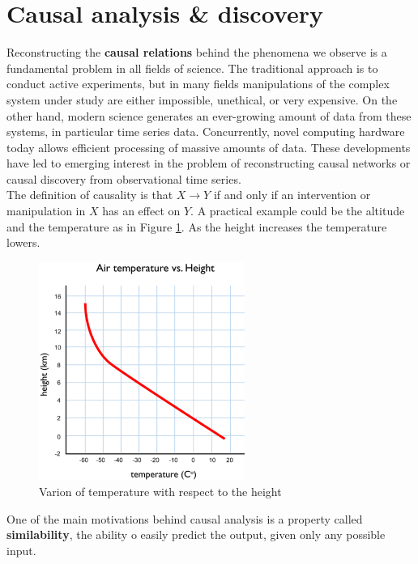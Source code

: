 \section{Causal analysis \& discovery}
Reconstructing the \textbf{causal relations} behind the phenomena we observe is 
a fundamental problem in all fields of science.
The traditional approach is to conduct active experiments, but in many fields
manipulations of the complex system under study are either impossible, 
unethical, or very expensive.
On the other hand, modern science generates an ever-growing amount of data 
from these systems, in particular time series data.
Concurrently, novel computing hardware today allows efficient processing 
of massive amounts of data. These developments have led to emerging interest 
in the problem of reconstructing causal networks or causal discovery from 
observational time series.\\

The definition of causality is that $X \rightarrow Y$ if and only if an intervention or
manipulation in $X$ has an effect on $Y$.
A practical example could be the altitude and the temperature as in Figure \ref{fig:tempvsheight}.
As the height increases the temperature lowers.

\begin{minipage}[c]{0.3\textwidth}
    \begin{figure}[H]
        \includegraphics[width=0.6\textwidth]{img/tempvsheight.png}
        \centering
        \caption{Varion of temperature with respect to the height}
        \label{fig:tempvsheight}
    \end{figure}
\end{minipage}
\begin{minipage}[c]{0.6\textwidth}
    One of the main motivations behind causal analysis is a property called \textbf{similability}, 
    the ability o easily predict the output, given only any possible input.
\end{minipage}\\


